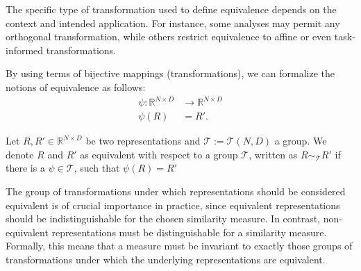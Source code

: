 The specific type of transformation used to define equivalence depends on the context and intended application.  
For instance, some analyses may permit any orthogonal transformation, while others restrict equivalence to affine or even task-informed transformations.


By using terms of bijective mappings (transformations), we can formalize the notions of equivalence as follows:
\begin{align*}
    \psi:\mathbb{R}^{N\times D} &\to \mathbb{R}^{N\times D}\\
    \psi(R)&=R'.
\end{align*}


\begin{definition}
    Let $R,R' \in\mathbb{R}^{N\times D}$ be two representations and $\mathcal{T}:=\mathcal{T}(N,D)$ a group. 
    We denote $R$ and $R'$ as equivalent with respect to a group $\mathcal{T}$, written as $R \sim_\mathcal{T}R'$ if there is a $\psi\in \mathcal{T}$, such that $\psi(R)=R'$
\end{definition}
The group of transformations under which representations should be considered equivalent is of crucial importance in practice, since equivalent representations should be indistinguishable for the chosen similarity measure.
In contrast, non-equivalent representations must be distinguishable for a similarity measure.
Formally, this means that a measure must be invariant to exactly those groups of transformations under which the underlying representations are equivalent.


